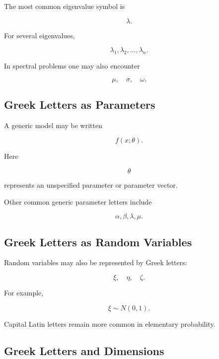 The most common eigenvalue symbol is

\[
\boxed{
\lambda.
}
\]

For several eigenvalues,

\[
\boxed{
\lambda_1,
\lambda_2,
\ldots,
\lambda_n.
}
\]

In spectral problems one may also encounter

\[
\boxed{
\mu,
\quad
\sigma,
\quad
\omega.
}
\]

\subsection{Greek Letters as Parameters}
\label{subsec:greek-parameters}

A generic model may be written

\[
\boxed{
f(x;\theta).
}
\]

Here

\[
\boxed{
\theta
}
\]

represents an unspecified parameter or parameter vector.

Other common generic parameter letters include

\[
\boxed{
\alpha,\beta,\lambda,\mu.
}
\]

\subsection{Greek Letters as Random Variables}
\label{subsec:greek-random-variables}

Random variables may also be represented by Greek letters:

\[
\boxed{
\xi,
\quad
\eta,
\quad
\zeta.
}
\]

For example,

\[
\boxed{
\xi\sim N(0,1).
}
\]

Capital Latin letters remain more common in elementary probability.

\subsection{Greek Letters and Dimensions}
\label{subsec:greek-dimensions}

